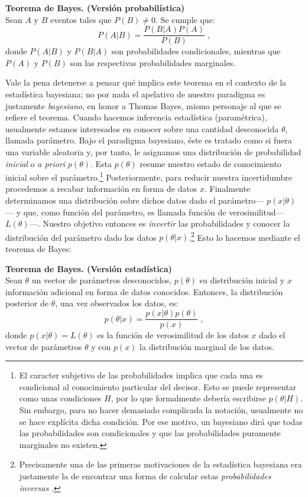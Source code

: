 \begin{teo} \label{teo:Bayes_1}
\textbf{Teorema de Bayes. (Versión probabilística)}\\
Sean $A$ y $B$ eventos tales que $P(B) \neq 0$. Se cumple que: 
\begin{equation*}
P(A|B)=\dfrac{P(B|A)P(A)}{P(B)}\;,
\end{equation*}
donde $P(A|B)$ y $P(B|A)$ son probabilidades condicionales, mientras que $P(A)$ y $P(B)$ son las respectivas probabilidades marginales. 
\end{teo}

Vale la pena detenerse a pensar qué implica este teorema en el contexto de la estadística bayesiana; no por nada el apelativo de nuestro paradigma es justamente \textit{bayesiano}, en honor a Thomas Bayes, mismo personaje al que se refiere el teorema. Cuando hacemos inferencia estadística (paramétrica), usualmente estamos interesados en conocer sobre una cantidad desconocida $\theta$, llamada parámetro. Bajo el paradigma bayesiano, éste es tratado como si fuera una variable aleatoria y, por tanto, le asignamos una  distribución de probabilidad \textit{inicial} o \textit{a priori} $p(\theta)$. Esta $p(\theta)$ resume nuestro estado de conocimiento inicial sobre el parámetro.\footnote{El caracter subjetivo de las probabilidades implica que cada una es condicional al conocimiento particular del decisor. Esto se puede representar como unas condiciones $H$, por lo que formalmente debería escribirse $p(\theta|H)$. Sin embargo, para no hacer demasiado complicada la notación, usualmente no se hace explícita dicha condición. Por ese motivo, un bayesiano dirá que todas las probabilidades son condicionales y que las probabilidades puramente marginales no existen.} Posteriormente, para reducir nuestra incertidumbre procedemos a recabar información en forma de datos $x$. Finalmente determinamos una distribución sobre dichos datos dado el parámetro--- $p(x|\theta)$--- y que, como función del parámetro, es llamada función de verosimilitud--- $L(\theta)$---. Nuestro objetivo entonces es \textit{invertir} las probabilidades y conocer la distribución del parámetro dado los datos $p(\theta|x)$.\footnote{Precisamente una de las primeras motivaciones de la estadística bayesiana era justamente la de encontrar una forma de calcular estas \textit{probabilidades inversas} \citep[8]{Robert07}.} Esto lo hacemos mediante el teorema de Bayes: 

\begin{teo} \label{teo:Bayes_2}
\textbf{Teorema de Bayes. (Versión estadística)}\\
Sean $\theta$ un vector de parámetros desconocidos, $p(\theta)$ su distribución inicial y $x$ información adicional en forma de datos conocidos. Entonces, la distribución posterior de $\theta$, una vez observados los datos, es: 
\begin{equation*}
p(\theta|x)=\dfrac{p(x|\theta)p(\theta)}{p(x)}\;,
\end{equation*}
donde $p(x|\theta) = L(\theta)$ es la función de verosimilitud de los datos $x$ dado el vector de parámetros $\theta$ y con $p(x)$ la distribución marginal de los datos. 
\end{teo}

